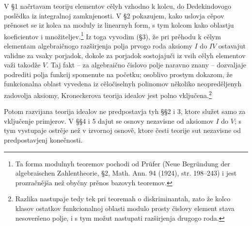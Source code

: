 \documentclass[11pt]{article}
\begin{document}
V §1 načrtavam teoriju elementov cělyh vzhodno k kolcu, do Dedekindovogo poslědka iz integralnoj zamknjenosti. V §2 pokazujem, kako uslovja cěpov prěnoset se iz kolca na moduly iz linearnyh form, s tym kolcom kako oblastju koeficientov i množiteljev.\footnote{Ta forma modulnyh teoremov pochodi od Prüfer (Neue Begründung der algebraischen Zahlentheorie, §2, Math. Ann. 94 (1924), str. 198--243) i jest prozračnějša než obyčny prěnos bazovyh teoremov.} Iz toga vyvodim (§3), že pri prěhodu k cělym elementam algebraičnogo razširjenja polja prvogo roda aksiomy $I$ do $IV$ ostavajut validne za vsaky porjadok, dokole za porjadok sostojajuči iz vsih cělyh elementov važi takodže $V$. Taj fakt -- za algebraično čislovo polje naravno znany -- dozvaljaje podrediti polja funkcij spomenute na početku; osoblivo prostym dokazom, že funkcionalna oblast vyvedena iz cěločiselnyh polinomov několiko neopreděljenyh zadovolja aksiomy, Kroneckerova teorija idealov jest polno vključena.\footnote{Razlika nastupaje tedy tek pri teoremah o diskriminantah, zato že kolco klasov ostatkov funkcionalnoj oblasti modulo prosty čislovy element stava nesoveršeno polje, i s tym možut nastupati razširjenja drugogo roda.}

Potom razvijana teorija idealov ne predpostavja tyh §§2 i 3, ktore služet samo za vključenje primjerov. V §§4 i 5 dajut se osnovy nezavisne od aksiomov $I$ do $V$; s tym vystupaje ostrěje než v izvornoj osnově, ktore česti teorije sut nezavisne od predpostavjenj konečnosti.
\end{document}
